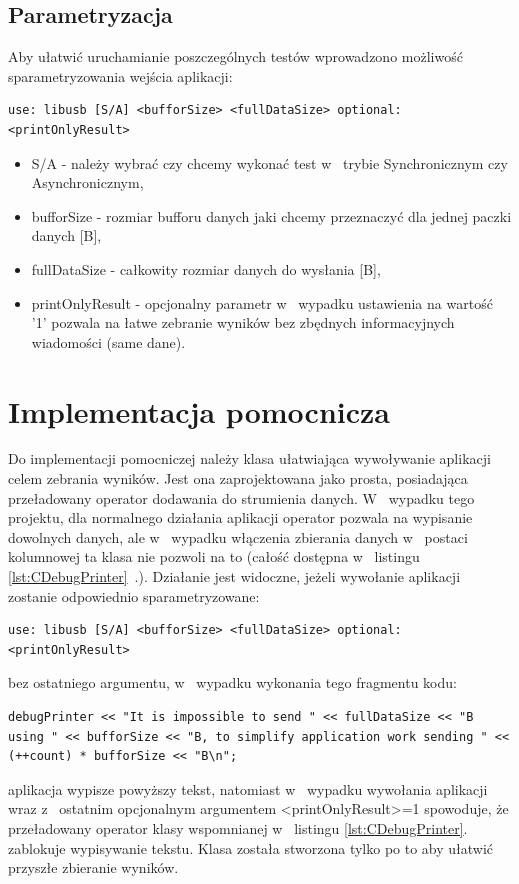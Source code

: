 \documentclass{BscUS}
\newcommand\blankpage{%
    \null
    \thispagestyle{empty}%
    \newpage}
\begin{document}
\subsection{Parametryzacja}
\noindent Aby ułatwić uruchamianie poszczególnych testów wprowadzono możliwość sparametryzowania wejścia aplikacji:
\begin{lstlisting}[caption={Parametryzacja aplikacji.}]
use: libusb [S/A] <bufforSize> <fullDataSize> optional:<printOnlyResult>
\end{lstlisting}
\begin{itemize}
\item S/A - należy wybrać czy chcemy wykonać test w~ trybie Synchronicznym czy Asynchronicznym,
\item bufforSize - rozmiar bufforu danych jaki chcemy przeznaczyć dla jednej paczki danych [B],
\item fullDataSize - całkowity rozmiar danych do wysłania [B],
\item printOnlyResult - opcjonalny parametr w~ wypadku ustawienia na wartość '1' pozwala na łatwe zebranie wyników bez zbędnych informacyjnych wiadomości (same dane). 
\end{itemize}
\section{Implementacja pomocnicza}
\label{sch:additionalImplementation}
Do implementacji pomocniczej należy klasa ułatwiająca wywoływanie aplikacji celem zebrania wyników. Jest ona zaprojektowana jako prosta, posiadająca przeładowany operator dodawania do strumienia danych. W~ wypadku tego projektu, dla normalnego działania aplikacji operator pozwala na wypisanie dowolnych danych, ale w~ wypadku włączenia zbierania danych w~ postaci kolumnowej ta klasa nie pozwoli na to (całość dostępna w~ listingu \ref{lst:CDebugPrinter}~.). Działanie jest widoczne, jeżeli wywołanie aplikacji zostanie odpowiednio sparametryzowane:
\begin{lstlisting}[caption={Uruchomienie testu.}]
use: libusb [S/A] <bufforSize> <fullDataSize> optional:<printOnlyResult>
\end{lstlisting}
bez ostatniego argumentu, w~ wypadku wykonania tego fragmentu kodu: 
\begin{lstlisting}[caption={Wypisywanie w~ zależności od argumentu wywołania aplikacji.}]
debugPrinter << "It is impossible to send " << fullDataSize << "B using " << bufforSize << "B, to simplify application work sending " << (++count) * bufforSize << "B\n";
\end{lstlisting}
aplikacja wypisze powyższy tekst, natomiast w~ wypadku wywołania aplikacji wraz z~ ostatnim opcjonalnym argumentem <printOnlyResult>=1 spowoduje, że przeładowany operator klasy wspomnianej w~ listingu \ref{lst:CDebugPrinter}. zablokuje wypisywanie tekstu.
Klasa została stworzona tylko po to aby ułatwić przyszłe zbieranie wyników.
\afterpage{\blankpage}
\end{document}
